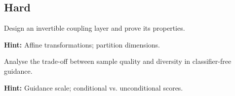 \subsection*{Hard}

\begin{problem}
Design an invertible coupling layer and prove its properties.

\textbf{Hint:} Affine transformations; partition dimensions.
\end{problem}

\begin{problem}
Analyse the trade-off between sample quality and diversity in classifier-free guidance.

\textbf{Hint:} Guidance scale; conditional vs. unconditional scores.
\end{problem}

